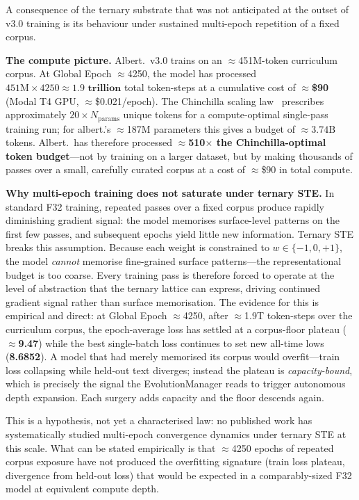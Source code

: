 \documentclass[11pt,a4paper]{article}
\begin{document}
A consequence of the ternary substrate that was not anticipated at the outset of v3.0
training is its behaviour under sustained multi-epoch repetition of a fixed corpus.

\textbf{The compute picture.}
Albert.\ v3.0 trains on an $\approx$451M-token curriculum corpus.
At Global Epoch $\approx$4250, the model has processed
$451\text{M} \times 4250 \approx \mathbf{1.9\text{ trillion}}$ total token-steps
at a cumulative cost of $\approx$\textbf{\$90} (Modal T4 GPU, $\approx$\$0.021/epoch).
The Chinchilla scaling law~\cite{hoffmann2022training} prescribes approximately
$20 \times N_\text{params}$ unique tokens for a compute-optimal single-pass training
run; for albert.'s $\approx$187M parameters this gives a budget of $\approx 3.74\text{B}$ tokens.
Albert.\ has therefore processed \textbf{$\approx$510$\times$ the Chinchilla-optimal token
budget}---not by training on a larger dataset, but by making thousands of passes over a
small, carefully curated corpus at a cost of $\approx$\$90 in total compute.

\textbf{Why multi-epoch training does not saturate under ternary STE.}
In standard F32 training, repeated passes over a fixed corpus produce rapidly
diminishing gradient signal: the model memorises surface-level patterns on the first
few passes, and subsequent epochs yield little new information. Ternary STE breaks
this assumption. Because each weight is constrained to $w \in \{-1, 0, +1\}$, the
model \emph{cannot} memorise fine-grained surface patterns---the representational
budget is too coarse. Every training pass is therefore forced to operate at the level
of abstraction that the ternary lattice can express, driving continued gradient
signal rather than surface memorisation. The evidence for this is empirical and
direct: at Global Epoch $\approx$4250, after $\approx$1.9T token-steps over the
curriculum corpus, the epoch-average loss has settled at a corpus-floor plateau
($\approx$\textbf{9.47}) while the best single-batch loss continues to set new all-time
lows (\textbf{8.6852}). A model that had merely memorised its corpus would overfit---train
loss collapsing while held-out text diverges; instead the plateau is \emph{capacity-bound},
which is precisely the signal the EvolutionManager reads to trigger autonomous depth
expansion. Each surgery adds capacity and the floor descends again.

This is a hypothesis, not yet a characterised law: no published work has
systematically studied multi-epoch convergence dynamics under ternary STE at this
scale. What can be stated empirically is that $\approx$4250 epochs of repeated corpus exposure
have not produced the overfitting signature (train loss plateau, divergence from
held-out loss) that would be expected in a comparably-sized F32 model at equivalent
compute depth.
\end{document}
